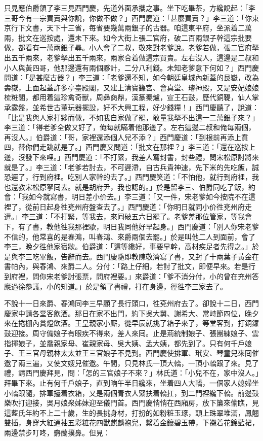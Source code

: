 只見應伯爵領了李三見西門慶，先道外面承攜之事。坐下吃畢茶，方纔說起：「李三哥今有一宗買賣與你說，你做不做？」西門慶道：「甚麼買賣？」李三道：「你東京行下文書，天下十三省，每省要幾萬兩銀子的古器。咱這東平府，坐派着二萬兩，批文在巡按處，還未下來。如今大街上張二官府，破二百兩銀子幹這宗批要做，都看有一萬兩銀子尋。小人會了二叔，敬來對老爹說。老爹若做，張二官府拏出五千兩來，老爹拏出五千兩來，兩家合着做這宗買賣。左右沒人，這邊是二叔和小人與黃四哥，他那邊還有兩個夥計，二分八利錢。未知老爹意下何如？」西門慶問道：「是甚麼古器？」李三道：「老爹還不知，如今朝廷皇城內新蓋的艮嶽，改為壽嶽，上面起蓋許多亭臺殿閣，又建上清寶籙宮、會真堂、璿神殿，又是安妃娘娘梳粧閣，都用着這珍禽奇獸，周彝商鼎，漢篆秦爐，宣王石鼓，歷代銅鞮，仙人掌承露盤，並希世古董玩器擺設，好不大興工程，好少錢糧！」{}西門慶聽了，說道：「比是我與人家打夥而做，不如我自家做了罷，敢量我拏不出這一二萬銀子來？」{}李三道：「得老爹全做又好了，俺每就瞞着他那邊了。左右這邊二叔和俺每兩個，再沒人。」伯爵道：「哥，家裡還添個人兒不添？」西門慶道：「到根前再添上賁四，替你們走跳就是了。」西門慶又問道：「批文在那裡？」李三道：「還在巡按上邊，沒發下來哩。」西門慶道：「不打緊，我差人寫封書，封些禮，問宋松原討將來就是了。」李三道：「老爹若討去，不可遲滯，自古兵貴神速，先下米的先吃飯，誠恐遲了，行到府裡。吃別人家幹的去了。」西門慶笑道：「不怕他，就行到府裡，我也還教宋松原拏囘去。就是胡府尹，我也認的。」於是留李三、伯爵同吃了飯，約會：「我如今就寫書，明日差小价去。」李三道：「又一件，宋老爹如今按院不在這裡了，從前日起身徃兗州府盤查去了。」西門慶道：「你明日就同小价徃兗州府走遭。」李三道：「不打緊，等我去，來囘破五六日罷了。老爹差那位管家，等我會下，有了書，教他徃我那裡歇，明日我同他好早起身。」西門慶道：「別人你宋老爹不信的，他常喜的是春鴻，叫春鴻、來爵兩個去罷。」於是叫他二人到面前，會了李三，晚夕徃他家宿歇。伯爵道：「這等纔好，事要早幹，高材疾足者先得之。」於是與李三吃畢飯，告辭而去。西門慶隨即教陳敬濟寫了書，又封了十兩葉子黃金在書帕內，與春鴻、來爵二人。分付：「路上仔細，若討了批文，即便早來。若是行到府裡，問你宋老爹討張票，問府裡要。」來爵道：「爹不消分付，小的曾在充州答應過徐叅議，小的知道。」於是領了書禮，打在身邊，徑徃李三家去了。

不說十一日來爵、春鴻同李三早顧了長行頭口，徃兗州府去了。卻說十二日，西門慶家中請各堂客飲酒。那日在家不出門，約下吳大舅、謝希大、常峙節四位，晚夕來在捲棚內賞燈飲酒。王皇親家小厮，從早辰就挑了箱子來了，等堂客到，打銅鑼鼓迎接。周守備娘子有眼疾不得來，差人來囘。止是荊統制娘子、張團練娘子、雲指揮娘子，並喬親家母、崔親家母、吳大姨、孟大姨，都先到了。只有何千戶娘子、王三官母親林太太並王三官娘子不見到。{}西門慶使排軍、玳安、琴童兒來囘催邀了兩三遍，又使文嫂兒催邀。午間，只見林氏一頂大轎，一頂小轎跟了來。見了禮，請西門慶拜見，問：「怎的三官娘子不來？」林氏道：「小兒不在，家中沒人。」拜畢下來。止有何千戶娘子，直到晌午半日纔來，坐着四人大轎，一個家人媳婦坐小轎跟隨，排軍擡着衣箱，又是兩個青衣人緊扶着轎扛，到二門裡纔下轎。前邊鼓樂吹打迎接，吳月娘衆姊妹迎至儀門首。西門慶悄悄在西廂房，放下簾來偷瞧，見這藍氏年約不上二十歲，生的長挑身材，打扮的如粉粧玉琢，頭上珠翠堆滿，鳳翹雙插，身穿大紅通袖五彩粧花四獸麒麟袍兒，繫着金鑲碧玉帶，下襯着花錦藍裙，兩邊禁步叮咚，麝蘭撲鼻。但見：

